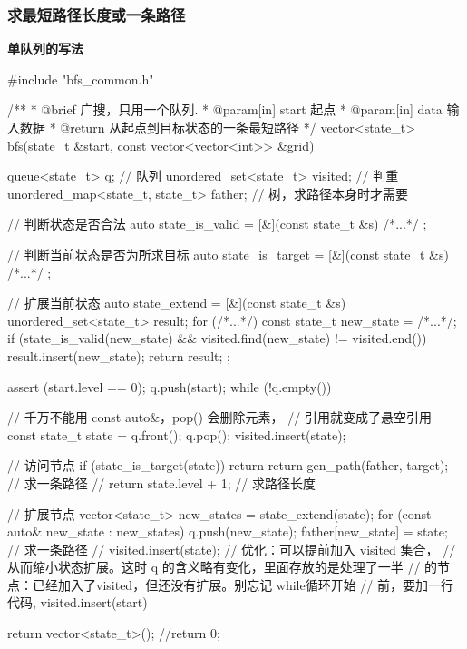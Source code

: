 \subsubsection{求最短路径长度或一条路径}

\textbf{单队列的写法}

\begin{Codex}[label=bfs_template.cpp]
#include "bfs_common.h"

/**
 * @brief 广搜，只用一个队列.
 * @param[in] start 起点
 * @param[in] data 输入数据
 * @return 从起点到目标状态的一条最短路径
 */
vector<state_t> bfs(state_t &start, const vector<vector<int>> &grid) {
    queue<state_t> q; // 队列
    unordered_set<state_t> visited; // 判重
    unordered_map<state_t, state_t> father; // 树，求路径本身时才需要

    // 判断状态是否合法
    auto state_is_valid = [&](const state_t &s) { /*...*/ };

    // 判断当前状态是否为所求目标
    auto state_is_target = [&](const state_t &s) { /*...*/ };

    // 扩展当前状态
    auto state_extend = [&](const state_t &s) {
        unordered_set<state_t> result;
        for (/*...*/) {
            const state_t new_state = /*...*/;
            if (state_is_valid(new_state) && 
                    visited.find(new_state) != visited.end()) {
                result.insert(new_state);
            }
        }
        return result;
    };

    assert (start.level == 0);
    q.push(start);
    while (!q.empty()) {
        // 千万不能用 const auto&，pop() 会删除元素，
        // 引用就变成了悬空引用
        const state_t state = q.front();
        q.pop();
        visited.insert(state);

        // 访问节点
        if (state_is_target(state)) {
            return return gen_path(father, target); // 求一条路径
            // return state.level + 1; // 求路径长度
        }

        // 扩展节点
        vector<state_t> new_states = state_extend(state);
        for (const auto& new_state : new_states) {
            q.push(new_state);
            father[new_state] = state;  // 求一条路径
            // visited.insert(state); // 优化：可以提前加入 visited 集合，
            // 从而缩小状态扩展。这时 q 的含义略有变化，里面存放的是处理了一半
            // 的节点：已经加入了visited，但还没有扩展。别忘记 while循环开始
            // 前，要加一行代码, visited.insert(start)
        }
    }

    return vector<state_t>();
    //return 0;
}
\end{Codex}



